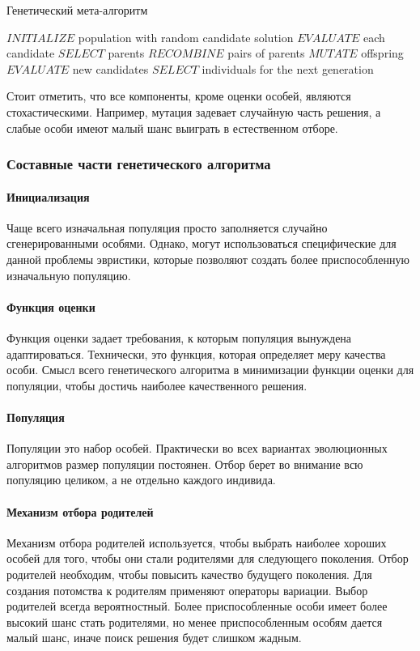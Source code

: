 \documentclass{fefu_thesis/cls/fefu}
\newenvironment{algo}[1][]
  {\begin{algorithm}[#1]
     \selectlanguage{english}
     \floatname{algorithm}{Алгоритм}
  }
  {\end{algorithm}}
\begin{document}
    \begin{algo}[H]
        \caption{Генетический мета-алгоритм}
        \label{meta-genetics}
        \begin{algorithmic}[1]
            \State $INITIALIZE$ population with random candidate solution
            \State $EVALUATE$ each candidate
                \State $SELECT$ parents
                \State $RECOMBINE$ pairs of parents
                \State $MUTATE$ offspring
                \State $EVALUATE$ new candidates
                \State $SELECT$ individuals for the next generation
            \EndWhile
        \end{algorithmic}
    \end{algo}

    Стоит отметить, что все компоненты, кроме оценки особей, являются стохастическими. Например, мутация задевает случайную часть решения, а слабые особи имеют малый шанс выиграть в естественном отборе.

    \subsubsection{Составные части генетического алгоритма}
    \paragraph{Инициализация}
    Чаще всего изначальная популяция просто заполняется случайно сгенерированными особями. Однако, могут использоваться специфические для данной проблемы эвристики, которые позволяют создать более приспособленную изначальную популяцию.
    \paragraph{Функция оценки}
    Функция оценки задает требования, к которым популяция вынуждена адаптироваться. Технически, это функция, которая определяет меру качества особи. Смысл всего генетического алгоритма в минимизации функции оценки для популяции, чтобы достичь наиболее качественного решения.
    \paragraph{Популяция}
    Популяции это набор особей. Практически во всех вариантах эволюционных алгоритмов размер популяции постоянен. Отбор берет во внимание всю популяцию целиком, а не отдельно каждого индивида.
    \paragraph{Механизм отбора родителей}
    Механизм отбора родителей используется, чтобы выбрать наиболее хороших особей для того, чтобы они стали родителями для следующего поколения. Отбор родителей необходим, чтобы повысить качество будущего поколения. Для создания потомства к родителям применяют операторы вариации. Выбор родителей всегда вероятностный. Более приспособленные особи имеет более высокий шанс стать родителями, но менее приспособленным особям дается малый шанс, иначе поиск решения будет слишком жадным.
\end{document}
